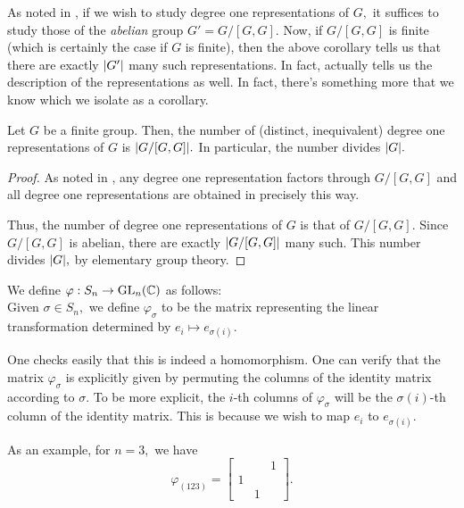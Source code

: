 \begin{ex}
	As noted in , if we wish to study degree one representations of $G,$ it suffices to study those of the \emph{abelian} group $G' = G/[G, G].$ Now, if $G/[G, G]$ is finite (which is certainly the case if $G$ is finite), then the above corollary tells us that there are exactly ${\left\lvert G' \right\lvert}$ many such representations. In fact,  actually tells us the description of the representations as well. In fact, there's something more that we know which we isolate as a corollary.
\end{ex}

\begin{cor} \label{cor:numdegoneirrepsdivG}
	Let $G$ be a finite group. Then, the number of (distinct, inequivalent) degree one representations of $G$ is ${\left\lvert G/[G, G] \right\lvert}.$ In particular, the number divides ${\left\lvert G \right\lvert}.$
\end{cor}
\begin{proof} 
	As noted in , any degree one representation factors through $G/[G, G]$ and all degree one representations are obtained in precisely this way.

	Thus, the number of degree one representations of $G$ is that of $G/[G, G].$ Since $G/[G, G]$ is abelian, there are exactly ${\left\lvert G/[G, G] \right\lvert}$ many such. This number divides ${\left\lvert G \right\lvert},$ by elementary group theory.
\end{proof}

\begin{ex} \label{ex:standardrepSn}
	We define $\varphi:S_n \to \operatorname{GL}_n(\mathbb{C})$ as follows:\\
	Given $\sigma \in S_n,$ we define $\varphi_\sigma$ to be the matrix representing the linear transformation determined by $e_i \mapsto e_{\sigma(i)}.$

	One checks easily that this is indeed a homomorphism. One can verify that the matrix $\varphi_\sigma$ is explicitly given by permuting the columns of the identity matrix according to $\sigma.$ To be more explicit, the $i$-th columns of $\varphi_\sigma$ will be the $\sigma(i)$-th column of the identity matrix. This is because we wish to map $e_i$ to $e_{\sigma(i)}.$ 

	As an example, for $n = 3,$ we have
	\begin{equation*} 
		\varphi_{(123)} = \begin{bmatrix}
			& & 1 \\
			1 & & \\
			 & 1 &
		\end{bmatrix}.
	\end{equation*}
\end{ex}

